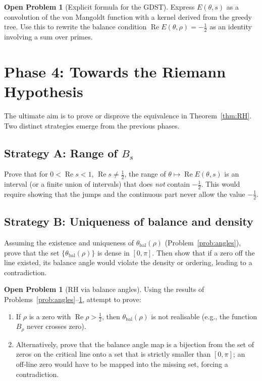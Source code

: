 \documentclass[11pt,a4paper]{article}
\theoremstyle{definition}
\newtheorem{problem}[theorem]{Open Problem}
\theoremstyle{remark}
\begin{document}
\begin{problem}[Explicit formula for the GDST]\label{prob:explicit}
Express \(E(\theta,s)\) as a convolution of the von Mangoldt function with a kernel derived from the greedy tree.
Use this to rewrite the balance condition \(\operatorname{Re}E(\theta,\rho)=-\frac12\) as an identity involving a sum over primes.
\end{problem}

\section{Phase 4: Towards the Riemann Hypothesis}
The ultimate aim is to prove or disprove the equivalence in Theorem~\ref{thm:RH}.
Two distinct strategies emerge from the previous phases.

\subsection{Strategy A: Range of \(B_s\)}
Prove that for \(0<\operatorname{Re}s<1\), \(\operatorname{Re}s\neq\frac12\), the range of \(\theta\mapsto\operatorname{Re}E(\theta,s)\) is an interval (or a finite union of intervals) that does \emph{not} contain \(-\frac12\).
This would require showing that the jumps and the continuous part never allow the value \(-\tfrac12\).

\subsection{Strategy B: Uniqueness of balance and density}
Assuming the existence and uniqueness of \(\theta_{\mathrm{bal}}(\rho)\) (Problem~\ref{prob:angles}), prove that the set \(\{\theta_{\mathrm{bal}}(\rho)\}\) is dense in \([0,\pi]\).
Then show that if a zero off the line existed, its balance angle would violate the density or ordering, leading to a contradiction.

\begin{problem}[RH via balance angles]\label{prob:RHfinal}
Using the results of Problems~\ref{prob:angles}--\ref{prob:explicit}, attempt to prove:
\begin{enumerate}[label=(\alph*)]
\item If \(\rho\) is a zero with \(\operatorname{Re}\rho>\frac12\), then \(\theta_{\mathrm{bal}}(\rho)\) is not realisable (e.g., the function \(B_\rho\) never crosses zero).
\item Alternatively, prove that the balance angle map is a bijection from the set of zeros on the critical line onto a set that is strictly smaller than \([0,\pi]\); an off‑line zero would have to be mapped into the missing set, forcing a contradiction.
\end{enumerate}
\end{problem}
\end{document}
